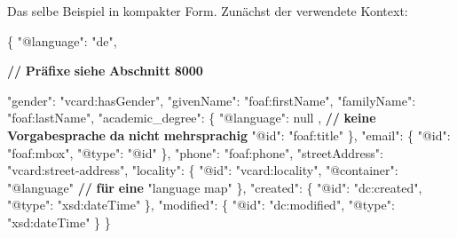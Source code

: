 \documentclass[,a4paper]{article}
\newenvironment{Shaded}{}{}
\newcommand{\DataTypeTok}[1]{\textcolor[rgb]{0.56,0.13,0.00}{{#1}}}
\newcommand{\DecValTok}[1]{\textcolor[rgb]{0.25,0.63,0.44}{{#1}}}
\newcommand{\StringTok}[1]{\textcolor[rgb]{0.25,0.44,0.63}{{#1}}}
\newcommand{\ErrorTok}[1]{\textcolor[rgb]{1.00,0.00,0.00}{\textbf{{#1}}}}
\newcommand{\NormalTok}[1]{{#1}}
\begin{document}
Das selbe Beispiel in kompakter Form. Zunächst der verwendete Kontext:

\begin{Shaded}
\begin{Highlighting}[]
\NormalTok{\{}
    \DataTypeTok{"@language"}\NormalTok{: }\StringTok{"de"}\NormalTok{,}
    
    \ErrorTok{//} \ErrorTok{Präfixe} \ErrorTok{siehe} \ErrorTok{Abschnitt} \ErrorTok{8000}

    \DataTypeTok{"gender"}\NormalTok{: }\StringTok{"vcard:hasGender"}\NormalTok{,}
    \DataTypeTok{"givenName"}\NormalTok{: }\StringTok{"foaf:firstName"}\NormalTok{,}
    \DataTypeTok{"familyName"}\NormalTok{: }\StringTok{"foaf:lastName"}\NormalTok{,}
    \DataTypeTok{"academic_degree"}\NormalTok{: \{}
        \DataTypeTok{"@language"}\NormalTok{: }\DecValTok{null} \NormalTok{, }\ErrorTok{//} \ErrorTok{keine} \ErrorTok{Vorgabesprache} \ErrorTok{da} \ErrorTok{nicht} \ErrorTok{mehrsprachig}
        \DataTypeTok{"@id"}\NormalTok{: }\StringTok{"foaf:title"}
    \NormalTok{\},}
    \DataTypeTok{"email"}\NormalTok{: \{}
        \DataTypeTok{"@id"}\NormalTok{: }\StringTok{"foaf:mbox"}\NormalTok{,}
        \DataTypeTok{"@type"}\NormalTok{: }\StringTok{"@id"}
    \NormalTok{\},}
    \DataTypeTok{"phone"}\NormalTok{: }\StringTok{"foaf:phone"}\NormalTok{,}
    \DataTypeTok{"streetAddress"}\NormalTok{: }\StringTok{"vcard:street-address"}\NormalTok{,}
    \DataTypeTok{"locality"}\NormalTok{: \{}
        \DataTypeTok{"@id"}\NormalTok{: }\StringTok{"vcard:locality"}\NormalTok{,}
        \DataTypeTok{"@container"}\NormalTok{: }\StringTok{"@language"} \ErrorTok{//} \ErrorTok{für} \ErrorTok{eine} \StringTok{"language map"}
    \NormalTok{\},}
    \DataTypeTok{"created"}\NormalTok{: \{}
        \DataTypeTok{"@id"}\NormalTok{: }\StringTok{"dc:created"}\NormalTok{,}
        \DataTypeTok{"@type"}\NormalTok{: }\StringTok{"xsd:dateTime"}
    \NormalTok{\},}
    \DataTypeTok{"modified"}\NormalTok{: \{}
        \DataTypeTok{"@id"}\NormalTok{: }\StringTok{"dc:modified"}\NormalTok{,}
        \DataTypeTok{"@type"}\NormalTok{: }\StringTok{"xsd:dateTime"}
    \NormalTok{\}}
\NormalTok{\}}
\end{Highlighting}
\end{Shaded}
\end{document}
